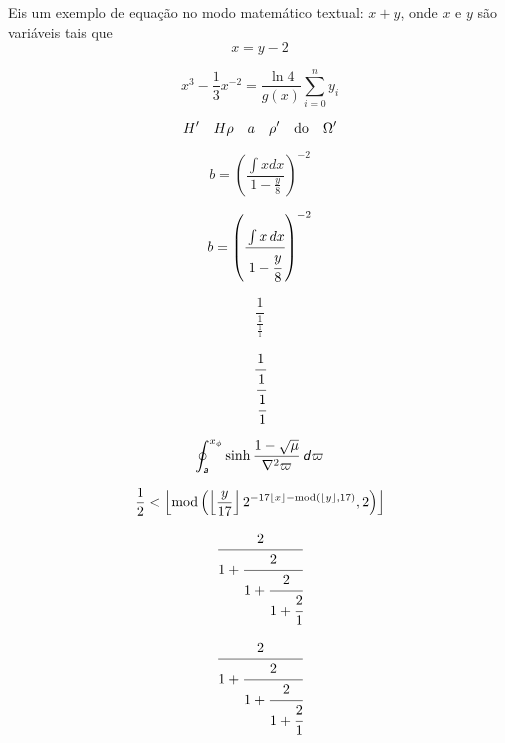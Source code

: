 \documentclass[11pt]{article}
\begin{document}
Eis um exemplo de equação no modo matemático textual: $x+y$, onde $x$ e $y$
são variáveis tais que 
\begin{equation}
    x = y - 2
\end{equation}

\[
    x^3 - \frac{1}{3} x^{-2} = \frac{\ln 4}{g(x)} \sum^n_{i=0} y_i
\]


\begin{equation*}
    H^\prime \quad H\rho \quad a\quad \rho^\prime\quad \textnormal{do} \quad \Omega^\prime
\end{equation*}

\begin{equation*}
b = (\frac{\int x dx}{1-\frac{y}{8}})^{-2}
\end{equation*}

\begin{equation*}
b = \left( \cfrac{\int x\, dx}{1-\cfrac{y}{8}} \right)^{-2}
\end{equation*}


\begin{equation*}
\frac{1}{\frac{1}{\frac{1}{1}}}
\end{equation*}

\begin{equation*}
\cfrac{1}{\cfrac{1}{\cfrac{1}{1}}}
\end{equation*}

\begin{equation*}
    \oint_{\textsf{\textit{a}}}^{x_\phi} \sinh \frac{1 - \sqrt{\mu}}{\nabla^2\varpi} \, \textsf{\textit{d}}\varpi
\end{equation*}

\begin{equation*}
    \frac{1}{2} < \left\lfloor \textnormal{mod} \left( \left\lfloor \frac{y}{17} \right\rfloor 2^{-17\left\lfloor x \right\rfloor - \textnormal{mod}\left( \left\lfloor y \right \rfloor ,  17 \right)}, 2 \right) \right\rfloor
\end{equation*}


\begin{equation*}
\cfrac{2}{1 + \cfrac{2}{1 + \cfrac{2}{1 + \cfrac{2}{1}}}}
\end{equation*}


\begin{equation*}
\cfrac{2}{1 + \cfrac{2}{1 + \cfrac{2}{1 + \cfrac{2}{1}}}}
\end{equation*}
\end{document}
